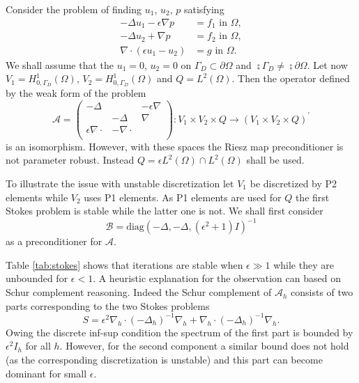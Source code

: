 \begin{example}\label{ex:stokes}
  Consider the problem of finding $u_1$, $u_2$, $p$ satisfying
  \[
  \begin{aligned}
  -\Delta u_1 -\epsilon\nabla p &= f_1\mbox{ in }\Omega,\\
  -\Delta u_2 + \nabla p &= f_2\mbox{ in }\Omega,\\
  \nabla\cdot(\epsilon u_1 - u_2) &= g\mbox{ in }\Omega.
  \end{aligned}
  \]
  We shall assume that the $u_1=0$, $u_2=0$ on $\Gamma_D\subset\partial\Omega$
  and $\semi{\Gamma_D}\neq\semi{\partial\Omega}$. Let now $V_1=H^{1}_{0, \Gamma_D}(\Omega)$,
  $V_2=H^{1}_{0, \Gamma_D}(\Omega)$ and $Q=L^2(\Omega)$. Then the operator defined 
  by the weak form of the problem
  \[
  \mathcal{A}=\begin{pmatrix}
  -\Delta & & -\epsilon\nabla\\
  & -\Delta & \nabla\\
  \epsilon\nabla\cdot & -\nabla\cdot & \\
  \end{pmatrix}: V_1\times V_2\times Q \rightarrow (V_1\times V_2\times Q)^{\prime}
  \]
  is an isomorphism. However, with these spaces the Riesz map preconditioner
  is not parameter robust. Instead $Q=\epsilon L^2(\Omega)\cap L^2{(\Omega)}$
  shall be used.

  To illustrate the issue with unstable discretization
  let $V_1$ be discretized by P2 elements while $V_2$ uses P1 elements. As
  P1 elements are used for $Q$ the first Stokes problem is stable while the
  latter one is not. We shall first consider
  \[
  \mathcal{B}=\text{diag}(-\Delta, -\Delta, (\epsilon^2+1)I)^{-1}
  \]
  as a preconditioner for $\mathcal{A}$.

  Table \ref{tab:stokes} shows that
  iterations are stable when $\epsilon\gg 1$ while they are unbounded for
  $\epsilon<1$. A heuristic explanation for
  the observation can based on Schur complement reasoning. Indeed the
  Schur complement of $\mathcal{A}_h$ consists of two parts corresponding
  to the two Stokes problems
  \[
  S = \epsilon^2\nabla_h\cdot(-\Delta_h)^{-1}\nabla_h + \nabla_h\cdot(-\Delta_h)^{-1}\nabla_h.
  \]
  Owing the discrete inf-sup condition the spectrum of the first part is
  bounded by $\epsilon^2 I_h$ for all $h$. However, for the second component
  a similar bound does not hold (as the corresponding discretization is unstable)
  and this part can become dominant for small $\epsilon$.


\end{example}
